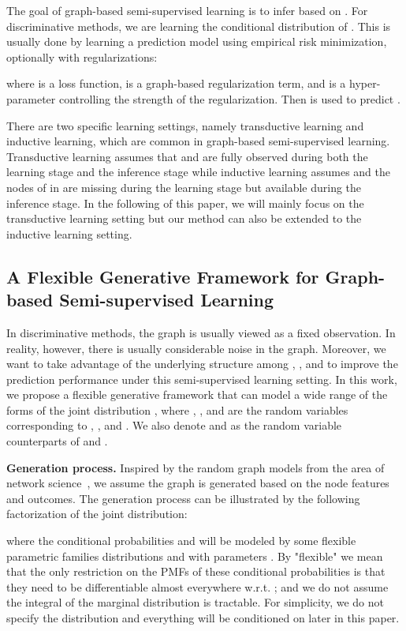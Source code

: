 \documentclass{article}
\newcommand{\vpara}[1]{\vspace{0.05in}\noindent\textbf{#1 }}
\begin{document}
The goal of graph-based semi-supervised learning is to infer  based on . For discriminative methods, we are learning the conditional distribution of . This is usually done by learning a prediction model  using empirical risk minimization, optionally with regularizations:

where  is a loss function,  is a graph-based regularization term, and  is a hyper-parameter controlling the strength of the regularization. Then  is used to predict .

There are two specific learning settings, namely transductive learning and inductive learning, which are common in graph-based semi-supervised learning. Transductive learning assumes that  and  are fully observed during both the learning stage and the inference stage while inductive learning assumes  and the nodes of  in  are missing during the learning stage but available during the inference stage. In the following of this paper, we will mainly focus on the transductive learning setting but our method can also be extended to the inductive learning setting.

\subsection{A Flexible Generative Framework for Graph-based Semi-supervised Learning}

In discriminative methods, the graph  is usually viewed as a fixed observation. In reality, however, there is usually considerable noise in the graph. Moreover, we want to take advantage of the underlying structure among , , and  to improve the prediction performance under this semi-supervised learning setting. In this work, we propose a flexible generative framework that can model a wide range of the forms of the joint distribution , where , , and  are the random variables corresponding to , , and . We also denote  and  as the random variable counterparts of  and . 

\vpara{Generation process.} Inspired by the random graph models from the area of network science~\cite{newman2010networks}, we assume the graph is generated based on the node features and outcomes. The generation process can be illustrated by the following factorization of the joint distribution:
	
where the conditional probabilities  and  will be modeled by some flexible parametric families distributions  and  with parameters . By "flexible" we mean that the only restriction on the PMFs of these conditional probabilities is that they need to be differentiable almost everywhere w.r.t. ; and we do not assume the integral of the marginal distribution  is tractable. For simplicity, we do not specify the distribution  and everything will be conditioned on  later in this paper.
\end{document}
